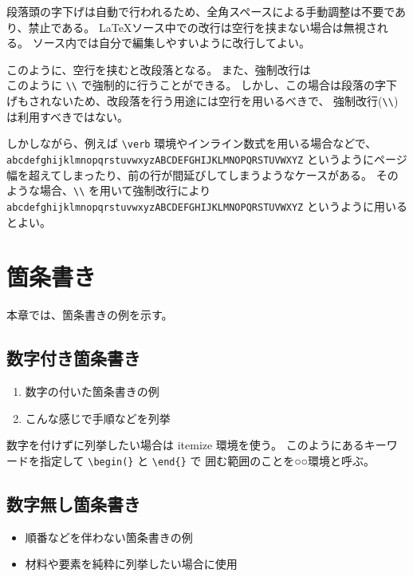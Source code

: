 \documentclass[12pt,a4paper,uplatex,dvipdfmx]{jsarticle}
\begin{document}
段落頭の字下げは自動で行われるため、全角スペースによる手動調整は不要であり、禁止である。
\LaTeX ソース中での改行は空行を挟まない場合は無視される。
ソース内では自分で編集しやすいように改行してよい。

このように、空行を挟むと改段落となる。
また、強制改行は\\このように \verb+\\+ で強制的に行うことができる。
しかし、この場合は段落の字下げもされないため、改段落を行う用途には空行を用いるべきで、
強制改行(\verb+\\+)は利用すべきではない。

しかしながら、例えば \verb+\verb+ 環境やインライン数式を用いる場合などで、
\verb+abcdefghijklmnopqrstuvwxyzABCDEFGHIJKLMNOPQRSTUVWXYZ+
というようにページ幅を超えてしまったり、前の行が間延びしてしまうようなケースがある。
そのような場合、\verb+\\+ を用いて強制改行により \\
\verb+abcdefghijklmnopqrstuvwxyzABCDEFGHIJKLMNOPQRSTUVWXYZ+
というように用いるとよい。

\section{箇条書き}
\label{sec:enum}

本章では、箇条書きの例を示す。

\subsection{数字付き箇条書き}
\label{subsec:enumerate}
\begin{enumerate}
 \item 数字の付いた箇条書きの例
 \item こんな感じで手順などを列挙
\end{enumerate}

数字を付けずに列挙したい場合は itemize 環境を使う。
このようにあるキーワードを指定して \verb+\begin(}+ と \verb+\end{}+ で
囲む範囲のことを○○環境と呼ぶ。

\subsection{数字無し箇条書き}
\label{subsec:itemize}

\begin{itemize}
 \item 順番などを伴わない箇条書きの例
 \item 材料や要素を純粋に列挙したい場合に使用
\end{itemize}
\end{document}
